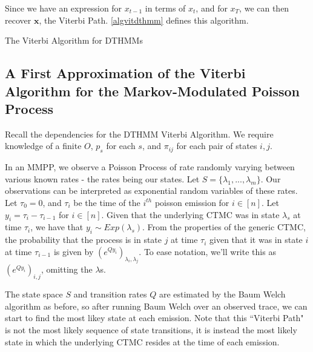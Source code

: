 Since we have an expression for $x_{t-1}$ in terms of $x_t$, and for $x_T$, we can then recover $\mathbf{x}$, the Viterbi Path. \ref{algvitdthmm} defines this algorithm.

\begin{algorithm}
\SetAlgoLined
{}

\caption{The Viterbi Algorithm for DTHMMs}\label{algvitdthmm}

\end{algorithm}

\subsection{A First Approximation of the Viterbi Algorithm for the Markov-Modulated Poisson Process}

Recall the dependencies for the DTHMM Viterbi Algorithm. We require knowledge of a finite $O$, $p_s$ for each $s$, and $\pi_{ij}$ for each pair of states $i,j$.

In an MMPP, we observe a Poisson Process of rate randomly varying between various known rates - the rates being our states. Let $S = \{\lambda_1,...,\lambda_m\}$. Our observations can be interpreted as exponential random variables of these rates. Let $\tau_0 = 0$, and $\tau_i$ be the time of the $i^{th}$ poisson emission for $i \in [n]$. Let $y_i = \tau_i-\tau_{i-1}$ for $i \in [n]$. Given that the underlying CTMC was in state $\lambda_s$ at time $\tau_i$, we have that $y_i \sim Exp (\lambda_s)$. From the properties of the generic CTMC, the probability that the process is in state $j$ at time $\tau_i$ given that it was in state $i$ at time $\tau_{i-1}$ is given by $(e^{Qy_i})_{\lambda_{i},\lambda_{j}}$. To ease notation, we'll write this as $(e^{Qy_i})_{i,j}$, omitting the $\lambda$s.

The state space $S$ and transition rates $Q$ are estimated by the Baum Welch algorithm as before, so after running Baum Welch over an observed trace, we can start to find the most likey state at each emission. Note that this ``Viterbi Path" is not the most likely sequence of state transitions, it is instead the most likely state in which the underlying CTMC resides at the time of each emission. 

